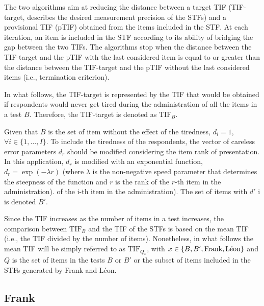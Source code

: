 \documentclass{svproc}
\begin{document}
The two algorithms aim at reducing the distance between a target TIF (TIF-target, describes the desired measurement precision of the STFs) and a provisional TIF (pTIF) obtained from the items included in the STF. 
At each iteration, an item is included in the STF according to its ability of bridging the gap between the two TIFs. 
The algorithms stop when the distance between the TIF-target and the pTIF with the last considered item is equal to or greater than the distance between the TIF-target and the pTIF without the last considered items (i.e., termination criterion). 

In what follows, the TIF-target is represented by the TIF that would be obtained if respondents would never get tired during the administration of all the items in a test $B$. Therefore, the TIF-target is denoted as  $\text{TIF}_B$.

Given that $B$ is the set of item without the effect of the tiredness, $d_i = 1$, $\forall i \in \{1, \ldots, I\}$. To include the tiredness of the respondents, the vector of careless error parameters $d_r$ should be modified considering the item rank of presentation. In this application, $d_r$ is modified with an exponential function, $d_r = \exp(-\lambda r)$ (where $\lambda$ is the non-negative speed parameter that determines the steepness of the function and $r$ is the rank of the $r$-th item in the administration). of the i-th item in the administration).
The set of items with $d'$
i is denoted $B'$.

Since the TIF increases as the number of items in a test increases, the comparison between $\text{TIF}_B$ and the TIF of the STFs is based on the mean TIF (i.e., the TIF divided by the number of items). Nonetheless, in what follows the mean TIF will be simply referred to as $\text{TIF}_{Q_x}$, with $x \in \{B, B', \text{Frank}, \text{\text{Léon}}\}$ and $Q$ is the set of items in the tests $B$ or $B'$ or the subset of items included in the STFs generated by Frank and Léon.

\subsection{Frank}

\end{document}
